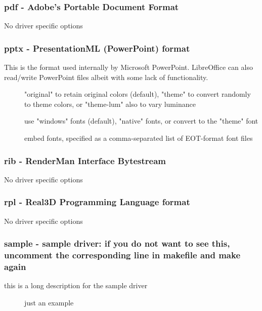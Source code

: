 \documentclass[english,a4paper]{article}
\begin{document}
\subsubsection{pdf - Adobe's Portable Document Format}
No driver specific options
\subsubsection{pptx - PresentationML (PowerPoint) format}
This is the format used internally by Microsoft PowerPoint.  LibreOffice can also read/write PowerPoint files albeit with some lack of functionality.

\begin{description}
\item[]
"original" to retain original colors (default), "theme" to convert randomly to theme colors, or "theme-lum" also to vary luminance


\item[]
use "windows" fonts (default), "native" fonts, or convert to the "theme" font


\item[]
embed fonts, specified as a comma-separated list of EOT-format font files


\end{description}
\subsubsection{rib - RenderMan Interface Bytestream}
No driver specific options
\subsubsection{rpl - Real3D Programming Language format}
No driver specific options
\subsubsection{sample - sample driver: if you do not want to see this, uncomment the corresponding line in makefile and make again}
this is a long description for the sample driver

\begin{description}
\item[]
just an example


\end{description}
\end{document}
